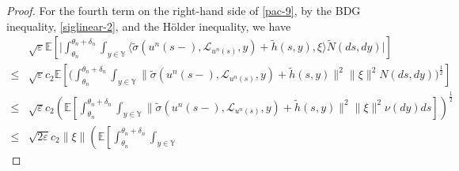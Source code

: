 \documentclass[11pt]{article}
\numberwithin{equation}{section}
\theoremstyle{plain}
\begin{document}
\begin{proof}
 For the fourth term on the right-hand side of \eqref{pac-9},
 by the BDG inequality, \eqref{siglinear-2}, and 
 the H\"{o}lder inequality,
 we have 
 \begin{align} \label{pac-19}  
       & \sqrt{\varepsilon} 
           \mathbb{E} 
                  \left[ 
                          \Big| \int_{\theta_n}^{\theta_n + \delta_n} 
                               \int_{y \in \mathbb{Y} }
                                   \langle
                                          \widetilde{\sigma}(u^n(s-), \mathcal{L}_{u^n(s)}, y) 
                                          +  \widetilde{h}(s, y), 
                                          \xi 
                                  \rangle
                           \widetilde{N}(ds, dy) 
                       \Big| 
                   \right]  \nonumber\\
  \le & \sqrt{\varepsilon} c_2
                \mathbb{E} 
                       \left[
                                \Big( \int_{\theta_n}^{\theta_n + \delta_n} 
                                             \int_{y \in \mathbb{Y} }
                                                      \| \widetilde{\sigma}(u^n(s-), \mathcal{L}_{u^n(s)}, y)
                                                         + \widetilde{h}(s, y)
                                                      \|^2 
                                                      \| \xi \|^2 
                                             N(ds, dy) 
                               \Big)^{\frac{1}{2} }
                      \right] \nonumber\\
  \le & \sqrt{\varepsilon} c_2
                 \left( \mathbb{E} 
                                   \left[ \int_{\theta_n}^{\theta_n + \delta_n} 
                                                 \int_{y \in \mathbb{Y} }
                                                          \| \widetilde{\sigma}(u^n(s-), \mathcal{L}_{u^n(s)}, y)
                                                             + \widetilde{h}(s, y)
                                                          \|^2 
                                                          \| \xi \|^2 
                                                   \nu(dy) ds
                                  \right] 
                  \right)^{\frac{1}{2} }  \nonumber\\
  \le & \sqrt{2 \varepsilon} c_2 \| \xi \|
                 \left( \mathbb{E} 
                                   \left[ \int_{\theta_n}^{\theta_n + \delta_n} 
                                                 \int_{y \in \mathbb{Y} }

\end{align}
\end{proof}
\end{document}
